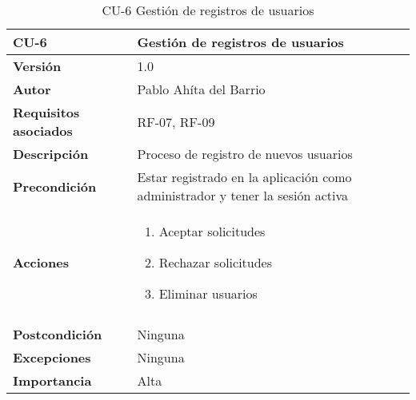 \begin{table}[p]
	\centering
	\begin{tabularx}{\linewidth}{ p{} p{} }
		\toprule
		\textbf{CU-6}    & \textbf{Gestión de registros de usuarios}\\
		\toprule
		\textbf{Versión}              & 1.0    \\
		\textbf{Autor}                & Pablo Ahíta del Barrio \\
		\textbf{Requisitos asociados} & RF-07, RF-09\\
		\textbf{Descripción}          & Proceso de registro de nuevos usuarios\\
		\textbf{Precondición}         & Estar registrado en la aplicación como administrador y tener la sesión activa \\
		\textbf{Acciones}             &
		\begin{enumerate}
			\def\labelenumi{\arabic{enumi}.}
			\tightlist
			\item Aceptar solicitudes
			\item Rechazar solicitudes
			\item Eliminar usuarios
		\end{enumerate}\\
		\\
		\textbf{Postcondición}        & Ninguna \\
		\textbf{Excepciones}          & Ninguna \\
		\textbf{Importancia}          & Alta \\
		\bottomrule
	\end{tabularx}
	\caption{CU-6 Gestión de registros de usuarios}
\end{table}

